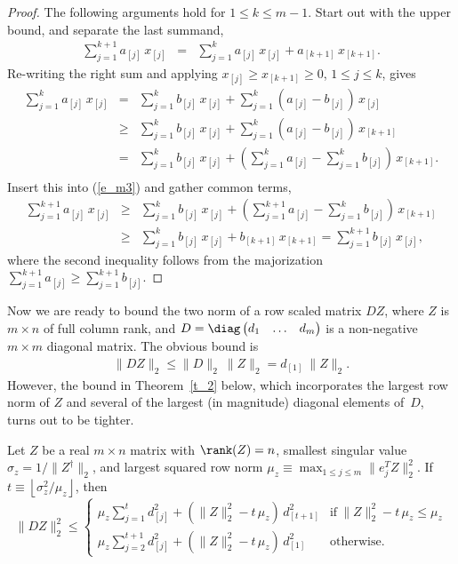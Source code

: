 \documentclass{siamltex}
\begin{document}
\begin{proof}
The following arguments hold for $1\leq k\leq m-1$. 
Start out with the upper bound, and separate the last summand,
\begin{eqnarray}\label{e_m3}
\sum_{j=1}^{k+1}{a_{[j]}\,x_{[j]}} &=&
\sum_{j=1}^{k}{a_{[j]}\,x_{[j]}}  + a_{[k+1]}\,x_{[k+1]}.
\end{eqnarray}
Re-writing the right sum and applying 
$x_{[j]}\geq x_{[k+1]}\geq 0$, $1\leq j\leq k$, gives
\begin{eqnarray*}
\sum_{j=1}^{k}{a_{[j]}\,x_{[j]}}  &=& \sum_{j=1}^{k}{b_{[j]}\,x_{[j]}}  +
\sum_{j=1}^{k}{(a_{[j]}-b_{[j]})\,x_{[j]}}\\
&\geq & \sum_{j=1}^{k}{b_{[j]}\,x_{[j]}}  +
\sum_{j=1}^{k}{(a_{[j]}-b_{[j]})}\, x_{[k+1]} \\
&= & \sum_{j=1}^{k}{b_{[j]}\,x_{[j]}}  +
\left(\sum_{j=1}^{k}{a_{[j]}}-\sum_{j=1}^{k}{b_{[j]}}\right)\, x_{[k+1]}.\\
\end{eqnarray*}
Insert this into (\ref{e_m3}) and gather common terms,
\begin{eqnarray*}
\sum_{j=1}^{k+1}{a_{[j]}\,x_{[j]}} &\geq &
\sum_{j=1}^{k}{b_{[j]}\,x_{[j]}}  +
\left(\sum_{j=1}^{k+1}{a_{[j]}}  
-\sum_{j=1}^{k}{b_{[j]}}\right)\, x_{[k+1]}\\
&\geq &\sum_{j=1}^{k}{b_{[j]}\,x_{[j]}}  + b_{[k+1]}\,x_{[k+1]}
=\sum_{j=1}^{k+1}{b_{[j]}\,x_{[j]}},
\end{eqnarray*}
where the second inequality follows from the majorization
$\sum_{j=1}^{k+1}{a_{[j]}}\geq \sum_{j=1}^{k+1} {b_{[j]}}$.
\end{proof}

Now we are ready to bound the two norm of a 
row scaled matrix $DZ$, where  $Z$ is $m\times n$ of full column rank, and
$D=\diag\begin{pmatrix}d_1 &\ldots & d_m\end{pmatrix}$
is a non-negative  $m\times m$  diagonal matrix. The obvious bound is
\begin{eqnarray}\label{e_sub}
\|DZ\|_2\leq \|D\|_2\>\|Z\|_2=d_{[1]}\>\|Z\|_2.
\end{eqnarray}
However, the bound in Theorem~\ref{t_2} below, which 
incorporates the largest row norm of $Z$ and several of the largest 
(in magnitude) diagonal elements  of~$D$, turns out to be tighter.

\begin{theorem}\label{t_2}
Let $Z$ be a real $m\times n$ matrix with $\rank(Z)=n$,
smallest singular value $\sigma_z=1/\|Z^{\dagger}\|_2$, and largest
squared row norm $\mu_z\equiv\max_{1\leq j\leq m}{\|e_j^TZ\|_2^2}$. If
$t\equiv\left\lfloor\sigma_z^2/\mu_z\right\rfloor$, then
$$\|DZ\|_2^2\leq 
\begin{cases}
\mu_z\sum_{j=1}^t{d_{[j]}^2}+\left(\|Z\|_2^2-t\,\mu_z\right)\,d_{[t+1]}^2 & 
\text{if}~ \|Z\|_2^2-t\,\mu_z\leq \mu_z \\
\mu_z\sum_{j=2}^{t+1}{d_{[j]}^2}+\left(\|Z\|_2^2-t\,\mu_z\right)\,d_{[1]}^2 &
\text{otherwise}.\end{cases}$$
\end{theorem}
\end{document}
